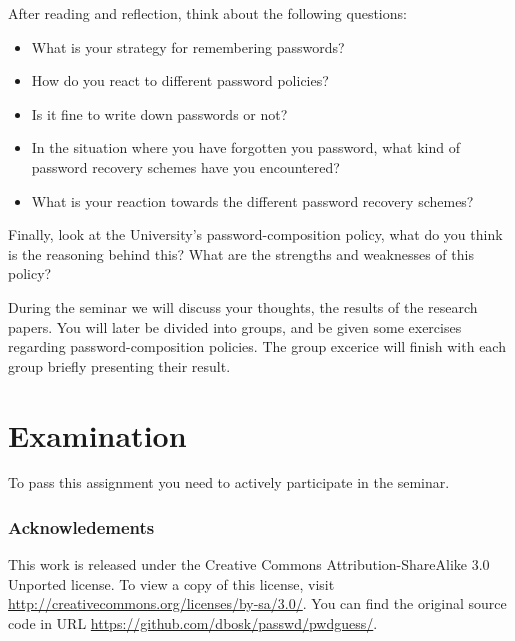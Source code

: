 After reading and reflection, think about the following questions:

\begin{itemize}
  \item What is your strategy for remembering passwords?
  \item How do you react to different password policies?
  \item Is it fine to write down passwords or not?
  \item In the situation where you have forgotten you password,
  	what kind of password recovery schemes have you encountered?
  \item What is your reaction towards the different password recovery schemes? 
\end{itemize}

Finally, look at the University's password-composition policy, what do you 
think is the reasoning behind this? What are the strengths and weaknesses of this policy?

During the seminar we will discuss your thoughts, the results of the research 
papers. You will later be divided into groups, and be given some exercises
regarding password-composition policies. The group excerice will finish with each group
briefly presenting their result.

\section{Examination}
\label{sec:exam}
To pass this assignment you need to actively participate in the seminar.

\subsubsection*{Acknowledements}

This work is released under the Creative Commons Attribution-ShareAlike 3.0 
Unported license.
To view a copy of this license, visit 
\url{http://creativecommons.org/licenses/by-sa/3.0/}.
You can find the original source code in URL 
\url{https://github.com/dbosk/passwd/pwdguess/}.

\printbibliography{}
